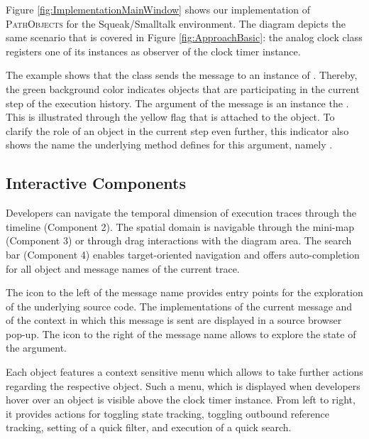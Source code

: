 Figure \ref{fig:ImplementationMainWindow} shows our implementation of \textsc{PathObjects} for the Squeak/Smalltalk environment.
The diagram depicts the same scenario that is covered in Figure \ref{fig:ApproachBasic}:
the analog clock class registers one of its instances as observer of the clock timer instance.

The example shows that the class  sends the  message to an instance of .
Thereby, the green background color indicates objects that are participating in the current step of the execution history.
The argument of the  message is an instance the .
This is illustrated through the yellow flag that is attached to the object.
To clarify the role of an object in the current step even further, this indicator also shows the name the underlying method defines for this argument, namely .

\subsection{Interactive Components}
Developers can navigate the temporal dimension of execution traces through the timeline (Component 2).
The spatial domain is navigable through the mini-map (Component 3) or through drag interactions with the diagram area.
The search bar (Component 4) enables target-oriented navigation and offers auto-completion for all object and message names of the current trace.

The icon to the left of the message name provides entry points for the exploration of the underlying source code.
The implementations of the current message and of the context in which this message is sent are displayed in a source browser pop-up.
The icon to the right of the message name allows to explore the state of the argument.

Each object features a context sensitive menu which allows to take further actions regarding the respective object.
Such a menu, which is displayed when developers hover over an object is visible above the clock timer instance.
From left to right, it provides actions for toggling state tracking, toggling outbound reference tracking, setting of a quick filter, and execution of a quick search.

